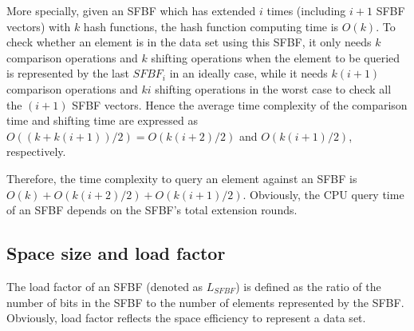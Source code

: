 \documentclass[10pt,journal,compsoc]{IEEEtran}
\begin{document}
More specially, given an SFBF which has extended $i$ times (including $i+1$ SFBF vectors) with $k$ hash functions, the hash function computing time is $O(k)$. To check whether an element is in the data set using this SFBF, it only needs $k$ comparison operations and $k$ shifting operations when the element to be queried is represented by the last $SFBF_i$ in an ideally case, while it needs $k(i+1)$ comparison operations and $ki$ shifting operations in the worst case to check all the $(i+1)$ SFBF vectors. Hence the average time complexity of the comparison time and shifting time are expressed as
$O((k+k(i+1))/2)=O(k(i+2)/2)$ and $O(k(i+1)/2)$, respectively.


Therefore, the time complexity to query an element against an SFBF is $O(k)+O(k(i+2)/2)+O(k(i+1)/2)$.
Obviously, the CPU query time of an SFBF depends on the SFBF's total extension rounds.

\subsection{Space size and load factor}
The load factor of an SFBF (denoted as $L_{SFBF}$) is defined as the ratio of the number of bits in the SFBF to the number of elements represented by the SFBF.
Obviously, load factor reflects the space efficiency to represent a data set.
\end{document}
